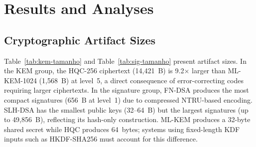\documentclass[12pt]{article}
\begin{document}
\section{Results and Analyses}
\subsection{Cryptographic Artifact Sizes}
Table~\ref{tab:kem-tamanho} and Table~\ref{tab:sig-tamanho} present artifact
sizes. In the KEM group, the HQC-256 ciphertext (14,421~B) is 9.2$\times$
larger than ML-KEM-1024 (1,568~B) at level~5, a direct consequence of
error-correcting codes requiring larger ciphertexts. In the signature group,
FN-DSA produces the most compact signatures (656~B at level~1) due to
compressed NTRU-based encoding. SLH-DSA has the smallest public keys (32--64~B)
but the largest signatures (up to 49,856~B), reflecting its hash-only
construction. ML-KEM produces a 32-byte shared secret while HQC produces
64~bytes; systems using fixed-length KDF inputs such as HKDF-SHA256 must
account for this difference.
\end{document}

